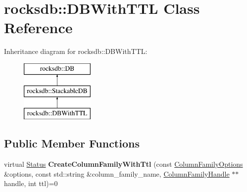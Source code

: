 \hypertarget{classrocksdb_1_1DBWithTTL}{}\section{rocksdb\+:\+:D\+B\+With\+T\+TL Class Reference}
\label{classrocksdb_1_1DBWithTTL}
Inheritance diagram for rocksdb\+:\+:D\+B\+With\+T\+TL\+:\begin{figure}[H]
\begin{center}
\leavevmode
\includegraphics[height=3.000000cm]{classrocksdb_1_1DBWithTTL}
\end{center}
\end{figure}
\subsection*{Public Member Functions}
\begin{DoxyCompactItemize}
\item 
virtual \hyperlink{classrocksdb_1_1Status}{Status} {\bfseries Create\+Column\+Family\+With\+Ttl} (const \hyperlink{structrocksdb_1_1ColumnFamilyOptions}{Column\+Family\+Options} \&options, const std\+::string \&column\+\_\+family\+\_\+name, \hyperlink{classrocksdb_1_1ColumnFamilyHandle}{Column\+Family\+Handle} $\ast$$\ast$handle, int ttl)=0\hypertarget{classrocksdb_1_1DBWithTTL_a97b67542889448b90229760b352bac20}{}\label{classrocksdb_1_1DBWithTTL_a97b67542889448b90229760b352bac20}

\end{DoxyCompactItemize}
